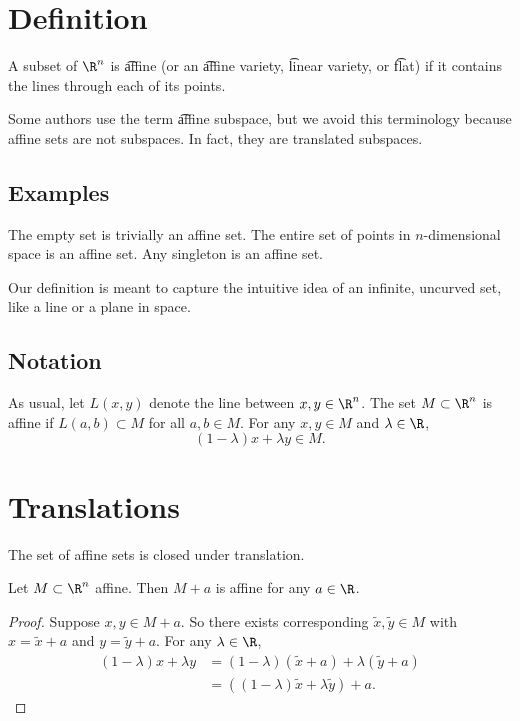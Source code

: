
\section*{Definition}

A subset of $\R ^n$ is \t{affine} (or an \t{affine variety}, \t{linear variety}, or \t{flat}) if it contains the lines through each of its points.

Some authors use the term \t{affine subspace}, but we avoid this terminology because affine sets are not subspaces.
In fact, they are translated subspaces.

\subsection*{Examples}

The empty set is trivially an affine set.
The entire set of points in $n$-dimensional space is an affine set.
Any singleton is an affine set.

Our definition is meant to capture the intuitive idea of an infinite, uncurved set, like a line or a plane in space.

\subsection*{Notation}

As usual, let $L(x, y)$ denote the line between $x, y \in \R ^n$.
The set $M \subset \R ^n$ is affine if $L(a, b) \subset M$ for all $a, b \in M$.
For any $x, y \in M$ and $\lambda  \in \R $,
  \[
(1-\lambda )x + \lambda y \in M.
  \]

\section*{Translations}

The set of affine sets is closed under translation.
\begin{proposition}
Let $M \subset \R ^n$ affine.
Then $M + a$ is affine for any $a \in \R $.
\begin{proof}
Suppose $x, y \in M+a$. So there exists corresponding $\tilde{x}, \tilde{y} \in M$ with $x = \tilde{x} + a$ and $y = \tilde{y} + a$.
For any $\lambda  \in \R $,
  \[
\begin{aligned}
(1-\lambda )x + \lambda y & = (1-\lambda )(\tilde{x} + a) + \lambda (\tilde{y} + a) \\
&= ((1-\lambda )\tilde{x} + \lambda \tilde{y}) + a.
\end{aligned}
  \]
\end{proof}
\end{proposition}

